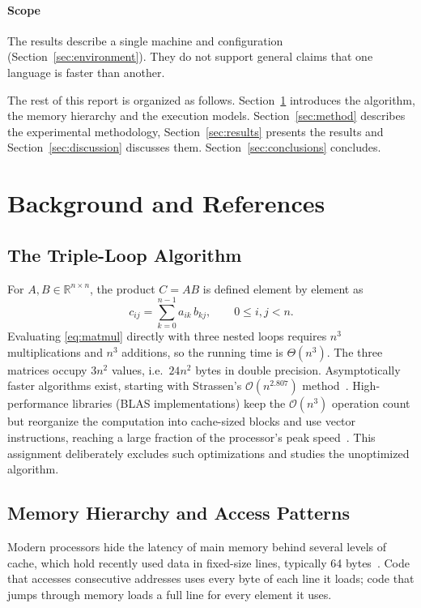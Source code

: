 \documentclass[conference,a4paper]{IEEEtran}
\newcommand{\bigO}[1]{\mathcal{O}\!\left(#1\right)}
\begin{document}
\paragraph{Scope} The results describe a single machine and configuration
(Section~\ref{sec:environment}). They do not support general claims that one
language is faster than another.

The rest of this report is organized as follows. Section~\ref{sec:background}
introduces the algorithm, the memory hierarchy and the execution models.
Section~\ref{sec:method} describes the experimental methodology,
Section~\ref{sec:results} presents the results and Section~\ref{sec:discussion}
discusses them. Section~\ref{sec:conclusions} concludes.

\section{Background and References}
\label{sec:background}

\subsection{The Triple-Loop Algorithm}
For $A, B \in \mathbb{R}^{n \times n}$, the product $C = AB$ is defined element
by element as
\begin{equation}
  c_{ij} = \sum_{k=0}^{n-1} a_{ik}\, b_{kj}, \qquad 0 \le i, j < n.
  \label{eq:matmul}
\end{equation}
Evaluating \eqref{eq:matmul} directly with three nested loops requires $n^3$
multiplications and $n^3$ additions, so the running time is $\Theta(n^3)$. The
three matrices occupy $3n^2$ values, i.e.\ $24n^2$ bytes in double precision.
Asymptotically faster algorithms exist, starting with Strassen's
$\bigO{n^{2.807}}$ method~\cite{strassen1969}. High-performance libraries
(BLAS implementations) keep the $\bigO{n^3}$ operation count but reorganize
the computation into cache-sized blocks and use vector instructions, reaching a
large fraction of the processor's peak speed~\cite{goto2008}. This assignment
deliberately excludes such optimizations and studies the unoptimized algorithm.

\subsection{Memory Hierarchy and Access Patterns}
Modern processors hide the latency of main memory behind several levels of
cache, which hold recently used data in fixed-size lines, typically 64
bytes~\cite{hennessy2017,drepper2007}. Code that accesses consecutive addresses
uses every byte of each line it loads; code that jumps through memory loads
a full line for every element it uses.
\end{document}
